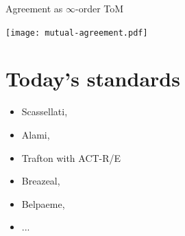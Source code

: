 \documentclass[compress]{beamer}
\begin{document}
{
\begin{frame}{Agreement as $\infty$-order ToM}
    \begin{center}
    \texttt{[image: mutual-agreement.pdf]}
    \end{center}


\end{frame}
}



\section{Today's standards}

\begin{frame}{}
    \begin{itemize}
        \item Scassellati,
        \item Alami,
        \item Trafton with ACT-R/E
        \item Breazeal,
        \item Belpaeme,
        \item ...

    \end{itemize}
\end{frame}
\end{document}
